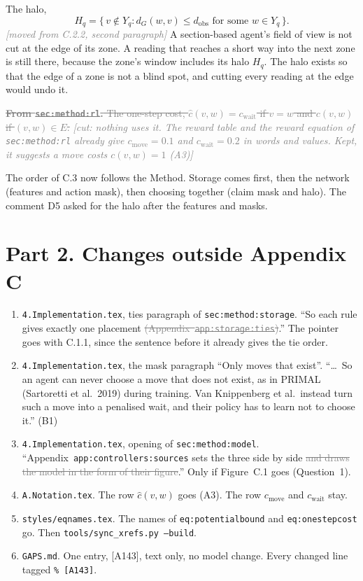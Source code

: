 \documentclass[11pt,a4paper]{article}
\newcommand{\new}[1]{\textcolor{newc}{#1}}
\newcommand{\old}[1]{\textcolor{gray}{\sout{#1}}}
\newcommand{\lref}[1]{{\small\texttt{#1}}}
\newcommand{\moved}[1]{{\small\textcolor{gray}{\emph{[moved from #1]}}}}
\newcommand{\cut}[1]{{\small\textcolor{gray}{\emph{[cut: #1]}}}}
\begin{document}
The halo,
\begin{equation}
  H_q = \{\, v \notin Y_q : d_G(w,v) \le d_{\mathrm{obs}}
          \text{ for some } w \in Y_q \,\}.
  \tag{C.5}
\end{equation}
\moved{C.2.2, second paragraph} A section-based agent's field of view is not
cut at the edge of its zone. A reading that reaches a short way into the next
zone is still there, because the zone's window includes its halo $H_q$. The
halo exists so that the edge of a zone is not a blind spot, and cutting every
reading at the edge would undo it.

\old{\textbf{From \lref{sec:method:rl}.} The one-step cost,
$\hat{c}(v,w) = c_{\mathrm{wait}}$ if $v = w$ and $c(v,w)$ if $(v,w) \in E$.}
\cut{nothing uses it. The reward table and the reward equation of
\lref{sec:method:rl} already give $c_{\mathrm{move}} = 0.1$ and
$c_{\mathrm{wait}} = 0.2$ in words and values. Kept, it suggests a move
costs $c(v,w) = 1$ (A3)}

The order of C.3 now follows the Method. Storage comes first, then the
network (features and action mask), then choosing together (claim mask and
halo). The comment D5 asked for the halo after the features and masks.

\section*{Part 2. Changes outside Appendix C}
\begin{enumerate}
  \item \texttt{4.Implementation.tex}, ties paragraph of
        \lref{sec:method:storage}. ``So each rule gives exactly one placement
        \old{(Appendix~\lref{app:storage:ties})}.'' The pointer goes with
        C.1.1, since the sentence before it already gives the tie order.
  \item \texttt{4.Implementation.tex}, the mask paragraph ``Only moves that
        exist''. ``\ldots\ So an agent can never choose a move that does not
        exist\new{, as in PRIMAL (Sartoretti et al.\ 2019) during
        training}. Van Knippenberg et al.\ instead turn such a move into a
        penalised wait, and their policy has to learn not to choose it.''
        (B1)
  \item \texttt{4.Implementation.tex}, opening of \lref{sec:method:model}.
        ``Appendix~\lref{app:controllers:sources} sets the three side by
        side\old{ and draws the model in the form of their figure}.'' Only
        if Figure~C.1 goes (Question~1).
  \item \texttt{A.Notation.tex}. The row $\hat c(v,w)$ goes (A3). The
        row $c_{\mathrm{move}}$ and $c_{\mathrm{wait}}$ stay.
  \item \texttt{styles/eqnames.tex}. The names of \lref{eq:potentialbound} and
        \lref{eq:onestepcost} go. Then \texttt{tools/sync\_xrefs.py --build}.
  \item \texttt{GAPS.md}. One entry, [A143], text only, no model change.
        Every changed line tagged \texttt{\% [A143]}.
\end{enumerate}
\end{document}
